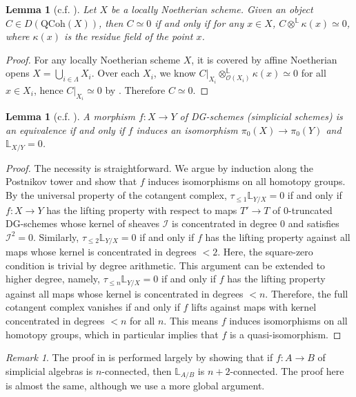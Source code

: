 \documentclass{article}
\numberwithin{equation}{section} %
\theoremstyle{plain}
\newtheorem{lemma}[theorem]{Lemma}
\theoremstyle{definition}
\theoremstyle{remark}
\newtheorem{remark}{Remark}
\begin{document}
\begin{lemma}[c.f. {\cite[Lemma 2.11]{N92}}]\label{Lemma_GlobalNeeman}
Let $X$ be a locally Noetherian scheme.
Given an object $C\in D(\mathrm{QCoh}(X))$, then $C\simeq0$ if and only if for any $x\in X$, $C\otimes^{\mathbb{L}}\kappa(x)\simeq0$, where $\kappa(x)$ is the residue field of the point $x$.
\end{lemma}
\begin{proof}
For any locally Noetherian scheme $X$, it is covered by affine Noetherian opens $\displaystyle X=\bigcup_{i\in\Lambda}X_i$.
Over each $X_i$, we know $C|_{X_i}\otimes^{\mathbb{L}}_{\mathcal{O}(X_i)}\kappa(x)\simeq0$ for all $x\in X_i$, hence $C|_{X_i}\simeq0$ by \cite[Lemma 2.11]{N92}.
Therefore $C\simeq0$.
\end{proof}

\begin{lemma}[c.f. {\cite[Corollary 3.2.17]{Lu04}}]\label{Lemma_GlobalLurie}
A morphism $f:X\to Y$ of DG-schemes (simplicial schemes) is an equivalence if and only if $f$ induces an isomorphism
$\pi_0(X)\to\pi_0(Y)$ and $\mathbb{L}_{X/Y}=0$.
\end{lemma}

\begin{proof}
The necessity is straightforward.
We argue by induction along the Postnikov tower and show that $f$ induces isomorphisms on all homotopy groups.
By the universal property of the cotangent complex, $\tau_{\leq1}\mathbb{L}_{Y/X}=0$ if and only if $f:X\to Y$ has the lifting property with respect to maps $T'\to T$ of $0$-truncated DG-schemes whose kernel of sheaves $\mathcal{I}$ is concentrated in degree $0$ and satisfies $\mathcal{I}^2=0$.
Similarly, $\tau_{\leq2}\mathbb{L}_{Y/X}=0$ if and only if $f$ has the lifting property against all maps whose kernel is concentrated in degrees $<2$.
Here, the square-zero condition is trivial by degree arithmetic.
This argument can be extended to higher degree, namely, $\tau_{\leq n}\mathbb{L}_{Y/X}=0$ if and only if $f$ has the lifting property against all maps whose kernel is concentrated in degrees $<n$.
Therefore, the full cotangent complex vanishes if and only if $f$ lifts against maps with kernel concentrated in degrees $<n$ for all $n$.
This means $f$ induces isomorphisms on all homotopy groups, which in particular implies that $f$ is a quasi-isomorphism.
\end{proof}

\begin{remark}
The proof in \cite[Corollary 3.2.17]{Lu04} is performed largely by showing that if $f:A\to B$ of simplicial algebras is $n$-connected, then $\mathbb{L}_{A/B}$ is $n+2$-connected.
The proof here is almost the same, although we use a more global argument. 
\end{remark}
\end{document}
